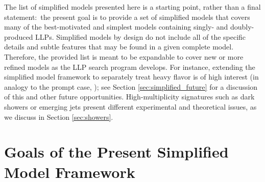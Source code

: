 The list of simplified models presented here is  a starting point, rather than a final statement:~the present goal is to provide a set of simplified models that covers many of the best-motivated and simplest models containing singly- and doubly-produced LLPs. Simplified models by design do not include all of the specific details and subtle features that may be found in a given complete model.  Therefore, the provided list is meant to be expandable to cover new or more refined models as the LLP search program develops.  For instance,  extending the simplified model framework to separately treat heavy flavor is of high interest (in analogy to the prompt case, \cite{Essig:2011qg}); see Section \ref{sec:simplified_future} for a discussion of this and other future opportunities.   High-multiplicity signatures such as dark showers or emerging jets present different experimental and theoretical issues, as we discuss in  Section \ref{sec:showers}.




\section{Goals of the Present Simplified Model Framework}


